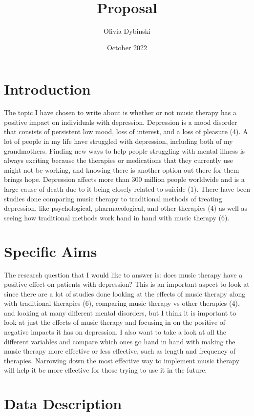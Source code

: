\documentclass[12pt]{article}
\title{Proposal}
\author{Olivia Dybinski\\}
\date{October 2022}
\begin{document}
 \maketitle


 \section{Introduction} 
 \label{sec:intro}

 The topic I have chosen to write about is whether or not music therapy has a positive impact on individuals with depression. Depression is a mood disorder that consists of persistent low mood, loss of interest, and a loss of pleasure (4). A lot of people in my life have struggled with depression, including both of my grandmothers. Finding new ways to help people struggling with mental illness is always exciting because the therapies or medications that they currently use might not be working, and knowing there is another option out there for them brings hope. Depression affects more than 300 million people worldwide and is a large cause of death due to it being closely related to suicide (1). There have been studies done comparing music therapy to traditional methods of treating depression, like psychological, pharmacological, and other therapies (4) as well as seeing how traditional methods work hand in hand with music therapy (6).

 \section{Specific Aims}
 \label{sec:aims}

 The research question that I would like to answer is: does music therapy have a positive effect on patients with depression? This is an important aspect to look at since there are a lot of studies done looking at the effects of music therapy along with traditional therapies (6), comparing music therapy vs other therapies (4), and looking at many different mental disorders, but I think it is important to look at just the effects of music therapy and focusing in on the positive of negative impacts it has on depression. I also want to take a look at all the different variables and compare which ones go hand in hand with making the music therapy more effective or less effective, such as length and frequency of therapies. Narrowing down the most effective way to implement music therapy will help it be more effective for those trying to use it in the future.

 \section{Data Description}
 \label{sec:data}
\end{document}
